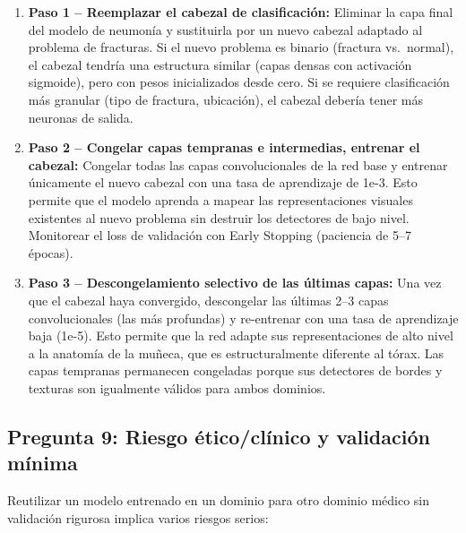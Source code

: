 \documentclass[12pt, letterpaper]{article}
\begin{document}
\begin{enumerate}[leftmargin=1.5cm]
    \item \textbf{Paso 1 -- Reemplazar el cabezal de clasificación:} Eliminar la capa final
    del modelo de neumonía y sustituirla por un nuevo cabezal adaptado al problema de fracturas.
    Si el nuevo problema es binario (fractura vs.\ normal), el cabezal tendría una estructura
    similar (capas densas con activación sigmoide), pero con pesos inicializados desde cero.
    Si se requiere clasificación más granular (tipo de fractura, ubicación), el cabezal debería
    tener más neuronas de salida.

    \item \textbf{Paso 2 -- Congelar capas tempranas e intermedias, entrenar el cabezal:}
    Congelar todas las capas convolucionales de la red base y entrenar únicamente el nuevo
    cabezal con una tasa de aprendizaje de 1e-3. Esto permite que el modelo aprenda a mapear
    las representaciones visuales existentes al nuevo problema sin destruir los detectores
    de bajo nivel. Monitorear el loss de validación con Early Stopping (paciencia de 5--7
    épocas).

    \item \textbf{Paso 3 -- Descongelamiento selectivo de las últimas capas:} Una vez que el
    cabezal haya convergido, descongelar las últimas 2--3 capas convolucionales (las más
    profundas) y re-entrenar con una tasa de aprendizaje baja (1e-5). Esto permite que la
    red adapte sus representaciones de alto nivel a la anatomía de la muñeca, que es
    estructuralmente diferente al tórax. Las capas tempranas permanecen congeladas porque
    sus detectores de bordes y texturas son igualmente válidos para ambos dominios.
\end{enumerate}

\subsection{Pregunta 9: Riesgo ético/clínico y validación mínima}

Reutilizar un modelo entrenado en un dominio para otro dominio médico sin validación rigurosa
implica varios riesgos serios:
\end{document}
